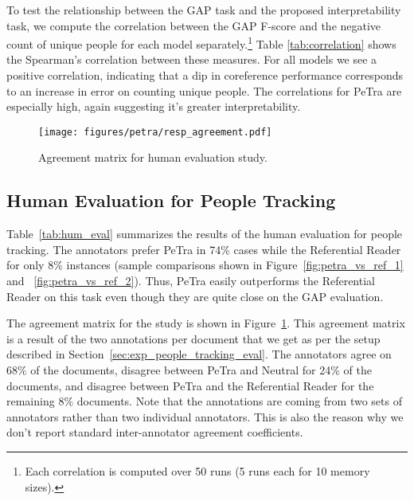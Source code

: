 \documentclass[12pt]{thesis-umich}[thesis]
\begin{document}
To test the relationship between the GAP task and the proposed interpretability task, we compute the correlation between the GAP F-score and the negative count of unique people for each model separately.\footnote{Each correlation is computed over 50 runs (5 runs each for 10 memory sizes).}
Table \ref{tab:correlation} shows the Spearman's correlation between these measures. For all models we see a positive correlation, indicating that a dip in coreference performance corresponds to an increase in error on counting unique people. The correlations for PeTra are especially high, again suggesting it's greater interpretability.





\begin{table}[t]
\caption{Human Evaluation results for people tracking.}
\label{tab:hum_eval}
\end{table}

\begin{figure}[t]
    \centering
    \texttt{[image: figures/petra/resp\_agreement.pdf]}
    \caption{Agreement matrix for human evaluation study.}
    \label{fig:agreement}
\end{figure} 
\subsection{Human Evaluation for People Tracking}
\label{sec:hum_eval}
Table~\ref{tab:hum_eval} summarizes the results of the human evaluation for people tracking. The annotators prefer PeTra in 74\% cases while the Referential Reader for only 8\% instances (sample comparisons shown in Figure~\ref{fig:petra_vs_ref_1} and ~\ref{fig:petra_vs_ref_2}). Thus, PeTra easily outperforms the Referential Reader on this task even though they are quite close on the GAP evaluation.

The agreement matrix for the study is shown in Figure~\ref{fig:agreement}.
This agreement matrix is a result of the two annotations per document that we get as per the setup described in Section~\ref{sec:exp_people_tracking_eval}.
The annotators agree on 68\% of the documents, disagree between PeTra and Neutral for 24\% of the documents, and disagree between PeTra and the Referential Reader for  the remaining 8\%  documents. 
Note that the annotations are coming from two sets of annotators rather than two individual annotators. This is also the reason why we don't report standard inter-annotator agreement coefficients.
\end{document}
